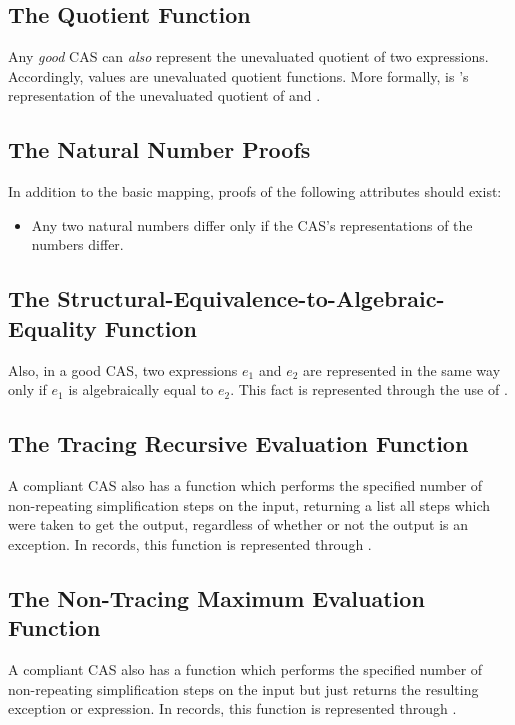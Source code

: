 \documentclass{report}
\begin{document}
\subsection{The Quotient Function}
Any \emph{good} CAS can \emph{also} represent the unevaluated quotient of two expressions.  Accordingly,  values are unevaluated quotient functions.  More formally,     is 's representation of the unevaluated quotient of  and .

\subsection{The Natural Number Proofs}
In addition to the basic mapping, proofs of the following attributes should exist:

\begin{itemize}
  \item Any two natural numbers differ only if the CAS's representations of the numbers differ.
\end{itemize}

\subsection{The Structural-Equivalence-to-Algebraic-Equality Function}
Also, in a good CAS, two expressions \(e_1\) and \(e_2\) are represented in the same way only if \(e_1\) is algebraically equal to \(e_2\).  This fact is represented through the use of .

\subsection{The Tracing Recursive Evaluation Function}
A compliant CAS also has a function which performs the specified number of non-repeating simplification steps on the input, returning a list all steps which were taken to get the output, regardless of whether or not the output is an exception.  In  records, this function is represented through .

\subsection{The Non-Tracing Maximum Evaluation Function}
A compliant CAS also has a function which performs the specified number of non-repeating simplification steps on the input but just returns the resulting exception or expression.  In  records, this function is represented through .
\end{document}
